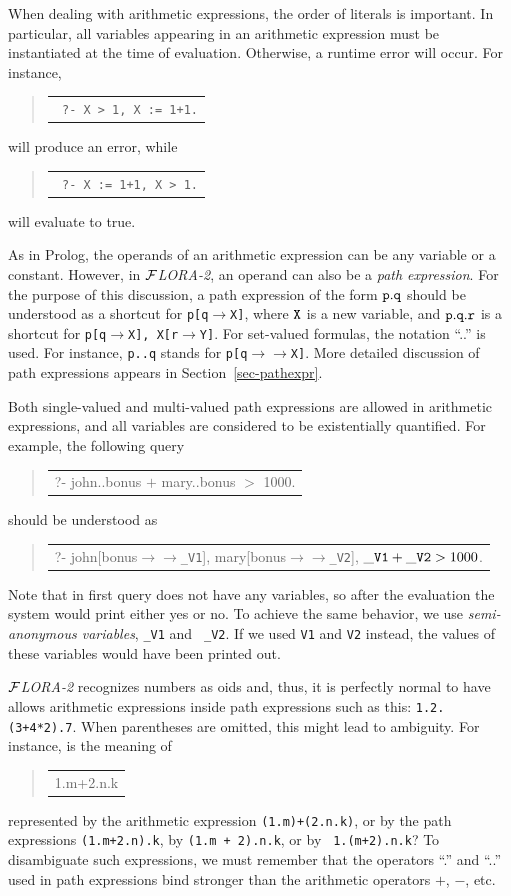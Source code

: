 \documentclass[11pt]{article}
\newenvironment{qrules}{\begin{quote}\tt\begin{tabular}[t]{l}}%
{\end{tabular}\end{quote}}
\newcommand{\fd}{\ensuremath{{\rightarrow}}}                   %
\newcommand{\mvd}{\ensuremath{{\rightarrow\!\!\!\!\rightarrow}}}  %
\newcommand{\FLORA}{{\mbox{${\cal F}${\small\it LORA}\rm\emph{-2}}}\xspace}
\begin{document}
When dealing with arithmetic expressions, the order of literals is
important.  In particular, all variables appearing in an arithmetic
expression must be instantiated at the time of evaluation. Otherwise, a
runtime error will occur. For instance, 
\begin{qrules}
  \tt
?- X > 1, X := 1+1.
\end{qrules}
will produce an error, while
\begin{qrules}
  \tt
?- X := 1+1, X > 1.
\end{qrules}
will evaluate to true.

As in Prolog, the operands of an arithmetic expression can be any variable
or a constant. However, in \FLORA, an operand can also be a \emph{path
  expression}. For the purpose of this discussion, a path expression of the
form $\tt p.q$ should be understood as a shortcut for {\tt p[q$\fd$X]}, where
$\tt X$ is a new variable, and $\tt p.q.r$ is a shortcut for {\tt p[q$\fd$X],
  X[r$\fd$Y]}. For set-valued formulas, the notation ``..'' is used. For
instance, {\tt p..q} stands for {\tt p[q$\mvd$X]}. More detailed discussion
of path expressions appears in Section~\ref{sec-pathexpr}.

Both single-valued and multi-valued path expressions are allowed in
arithmetic expressions, and all variables are considered to be
existentially quantified. For example, the following query
\begin{qrules}
?- john..bonus $+$ mary..bonus $>$ 1000.
\end{qrules}
should be understood as
\begin{qrules}
?- john[bonus{\mvd}{\tt \_V1}], mary[bonus{\mvd}{\tt \_V2}], ${\tt \_V1}+{\tt \_V2} > 1000$.
\end{qrules}
Note that in first query does not have any variables, so after the
evaluation the system would print either yes or no. To achieve the same
behavior, we use \emph{semi-anonymous variables}, {\tt \_V1} and {\tt
  \_V2}. If we used {\tt V1} and {\tt V2} instead, the values of these
variables would have been printed out.

\FLORA recognizes numbers as oids and, thus, it is perfectly normal to have
allows arithmetic expressions inside path expressions such as this:
{\tt 1.2.(3+4*2).7}. When parentheses are omitted, this might lead to
ambiguity.
For instance, is the meaning of
\begin{qrules}
1.m+2.n.k
\end{qrules}
represented by
the arithmetic expression {\tt (1.m)+(2.n.k)}, or by
the path expressions {\tt (1.m+2.n).k}, by {\tt (1.m + 2).n.k}, or by {\tt
  1.(m+2).n.k}? To disambiguate such expressions, we must remember that the
operators ``.'' and ``..'' used in path expressions bind stronger than the
arithmetic operators $+$, $-$, etc.
\end{document}
